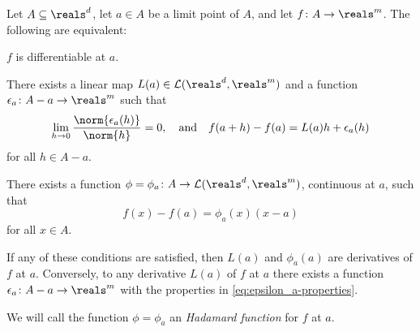 \documentclass[article, a4paper, 11pt, oneside]{memoir}
\numberwithin{equation}{chapter}
\newcommand{\calL}{\mathcal{L}}
\begin{document}
\begin{lemma}
    \label{lem:Hadamard-multiD}
    Let $A \subseteq \reals^d$, let $a \in A$ be a limit point of $A$, and let $f \colon A \to \reals^m$. The following are equivalent:
    \begin{enumlem}
        \item $f$ is differentiable at $a$.

        \item There exists a linear map $L(a) \in \calL(\reals^d,\reals^m)$ and a function $\epsilon_a \colon A-a \to \reals^m$ such that
        \begin{equation}
            \label{eq:epsilon_a-properties}
            \lim_{h \to 0} \frac{\norm{\epsilon_a(h)}}{\norm{h}} = 0,
            \quad \text{and} \quad
            f(a+h) - f(a)
                = L(a)h + \epsilon_a(h)
        \end{equation}
        for all $h \in A-a$.

        \item There exists a function $\phi = \phi_a \colon A \to \calL(\reals^d,\reals^m)$, continuous at $a$, such that
        \begin{equation*}
            f(x) - f(a)
                = \phi_a(x) (x - a)
        \end{equation*}
        for all $x \in A$.
    \end{enumlem}
    If any of these conditions are satisfied, then $L(a)$ and $\phi_a(a)$ are derivatives of $f$ at $a$. Conversely, to any derivative $L(a)$ of $f$ at $a$ there exists a function $\epsilon_a \colon A-a \to \reals^m$ with the properties in \cref{eq:epsilon_a-properties}.
\end{lemma}
%
We will call the function $\phi = \phi_a$ an \emph{Hadamard function} for $f$ at $a$.
\end{document}
